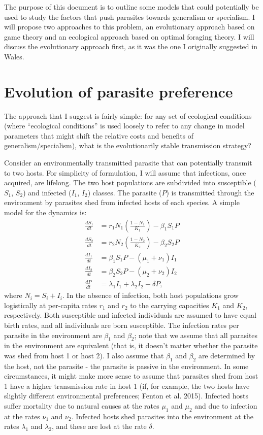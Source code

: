 \documentclass[11pt,reqno,final,pdftex]{amsart}\usepackage[]{graphicx}\usepackage[]{color}
\theoremstyle{plain}
\numberwithin{equation}{part}
\begin{document}
The purpose of this document is to outline some models that could potentially be used to study the factors that push parasites towards generalism or specialism.
I will propose two approaches to this problem, an evolutionary approach based on game theory and an ecological approach based on optimal foraging theory.
I will discuss the evolutionary approach first, as it was the one I originally suggested in Wales.

\section{Evolution of parasite preference}
The approach that I suggest is fairly simple: for any set of ecological conditions (where ``ecological conditions'' is used loosely to refer to any change in model parameters that might shift the relative costs and benefits of generalism/specialism), what is the evolutionarily stable transmission strategy?

Consider an environmentally transmitted parasite that can potentially transmit to two hosts.
For simplicity of formulation, I will assume that infections, once acquired, are lifelong.
The two host populations are subdivided into susceptible ($S_1$, $S_2$) and
infected ($I_1$, $I_2$) classes.
The parasite ($P$) is transmitted through the environment by parasites shed from infected hosts of each species.
A simple model for the dynamics is:
\begin{align*}
\frac{dS_1}{dt} &= r_1 N_1 \left(\frac{1-N_1}{K_1}\right) - \beta_1 S_1 P \\
\frac{dS_2}{dt} &= r_2 N_2 \left(\frac{1-N_2}{K_2}\right) - \beta_2 S_2 P \\
\frac{dI_1}{dt} &= \beta_1 S_1 P - (\mu_1 + \nu_1) I_1 \\
\frac{dI_2}{dt} &= \beta_2 S_2 P - (\mu_2 + \nu_2) I_2 \\
\frac{dP}{dt} &= \lambda_1 I_1 + \lambda_2 I_2 - \delta P,
\end{align*}
where $N_i = S_i + I_i$.
In the absence of infection, both host populations grow logistically at per-capita rates $r_1$ and $r_2$ to the carrying capacities $K_1$ and $K_2$, respectively.
Both susceptible and infected individuals are assumed to have equal birth rates, and all individuals are born susceptible.
The infection rates per parasite in the environment are $\beta_1$ and $\beta_2$; note that we assume that all parasites in the environment are equivalent (that is, it doesn't matter whether the parasite was shed from host 1 or host 2).
I also assume that $\beta_1$ and $\beta_2$ are determined by the host, not the parasite - the parasite is passive in the environment.
In some circumstances, it might make more sense to assume that parasites shed from host 1 have a higher transmission rate in host 1 (if, for example, the two hosts have slightly different environmental preferences; Fenton et al. 2015).
Infected hosts suffer mortality due to natural causes at the rates $\mu_1$ and $\mu_2$ and due to infection at the rates $\nu_1$ and $\nu_2$.
Infected hosts shed parasites into the environment at the rates $\lambda_1$ and $\lambda_2$, and these are lost at the rate $\delta$.
\end{document}
